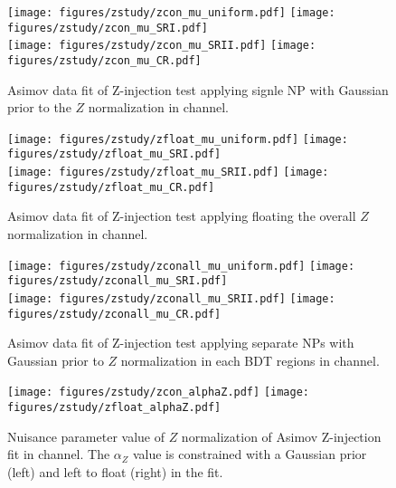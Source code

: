 \begin{figure}[htbp]
  \centering
 \texttt{[image: figures/zstudy/zcon\_mu\_uniform.pdf]}
 \texttt{[image: figures/zstudy/zcon\_mu\_SRI.pdf]}\\
 \texttt{[image: figures/zstudy/zcon\_mu\_SRII.pdf]}
 \texttt{[image: figures/zstudy/zcon\_mu\_CR.pdf]}\\

\caption{Asimov data fit of Z-injection test applying signle NP with Gaussian prior to the $Z$ normalization in \twocentral channel.}
  \label{fig:zinjection_Con}
\end{figure}


\begin{figure}[htbp]
  \centering
 \texttt{[image: figures/zstudy/zfloat\_mu\_uniform.pdf]}
 \texttt{[image: figures/zstudy/zfloat\_mu\_SRI.pdf]}\\
 \texttt{[image: figures/zstudy/zfloat\_mu\_SRII.pdf]}
 \texttt{[image: figures/zstudy/zfloat\_mu\_CR.pdf]}\\

\caption{Asimov data fit of Z-injection test applying floating the overall $Z$ normalization in \twocentral channel.}
  \label{fig:zinjection_Float}
\end{figure}


\begin{figure}[htbp]
  \centering
 \texttt{[image: figures/zstudy/zconall\_mu\_uniform.pdf]}
 \texttt{[image: figures/zstudy/zconall\_mu\_SRI.pdf]}\\
 \texttt{[image: figures/zstudy/zconall\_mu\_SRII.pdf]}
 \texttt{[image: figures/zstudy/zconall\_mu\_CR.pdf]}\\

\caption{Asimov data fit of Z-injection test applying separate NPs with Gaussian prior to $Z$ normalization in each BDT regions in \twocentral channel.}
  \label{fig:zinjection_ConAll}
\end{figure}


\begin{figure}[htbp]
  \centering
 \texttt{[image: figures/zstudy/zcon\_alphaZ.pdf]}
 \texttt{[image: figures/zstudy/zfloat\_alphaZ.pdf]}\\

\caption{Nuisance parameter value of $Z$ normalization of Asimov Z-injection fit in \twocentral channel. The $\alpha_{Z}$ value is constrained with a Gaussian prior (left) and left to float (right) in the fit.}
  \label{fig:zmu}
\end{figure}
